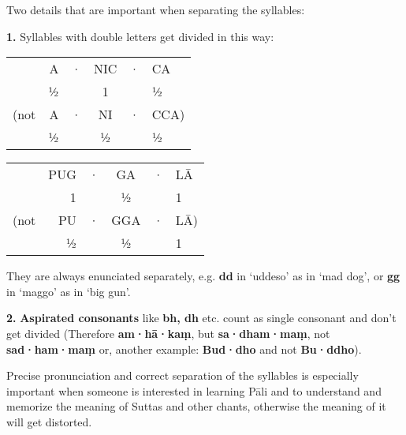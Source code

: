 Two details that are important when separating the syllables:

\textbf{1.} Syllables with double letters get divided in this way:

\begin{centering}

\begin{minipage}{0.8\linewidth}
\fontsize{8}{13}\selectfont
\begin{multicols}{2}
\setlength{\tabcolsep}{1.8pt}%

\begin{tabular}{@{} rrcccl @{}}
     & A & · & NIC & · & CA   \\
     & ½ &   &  1  &   & ½    \\
(not & A & · & NI  & · & CCA) \\
     & ½ &   & ½   &   & ½    \\
\end{tabular}

\columnbreak

\begin{tabular}{@{} rrcccl @{}}
     & PUG & · & GA  & · & LĀ \\
     &  1  &   &  ½  &   &  1 \\
(not & PU  & · & GGA & · & LĀ)\\
     &  ½  &   &  ½  &   &  1 \\
\end{tabular}

\end{multicols}
\end{minipage}

\end{centering}

\vspace*{\parskip}

They are always enunciated separately, e.g. \textbf{dd} in ‘uddeso’ as
in ‘mad dog’, or \textbf{gg} in ‘maggo’ as in ‘big gun’.

\textbf{2.} \textbf{Aspirated consonants} like \textbf{bh, dh} etc.
count as single consonant and don't get divided (Therefore
\textbf{am·hā·kaṃ}, but \textbf{sa·dham·maṃ}, not \textbf{sad·ham·maṃ}
or, another example: \textbf{Bud·dho} and not \textbf{Bu·ddho}).

Precise pronunciation and correct separation of the syllables is
especially important when someone is interested in learning Pāli and to
understand and memorize the meaning of Suttas and other chants,
otherwise the meaning of it will get distorted.

